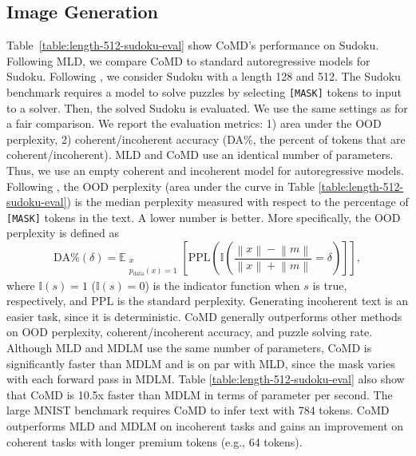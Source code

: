 \documentclass{article} %
\begin{document}
\subsection{Image Generation}
Table~\ref{table:length-512-sudoku-eval} show CoMD's performance on Sudoku. Following MLD, we compare CoMD to standard autoregressive models for Sudoku. Following \citet{coja2020replica}, we consider Sudoku with a length 128 and 512. The Sudoku benchmark requires a model to solve puzzles by selecting \texttt{[MASK]} tokens to input to a solver. Then, the solved Sudoku is evaluated. We use the same settings as \citet{coja2020replica} for a fair comparison. We report the evaluation metrics: 1) area under the OOD perplexity, 2) coherent/incoherent accuracy (DA\%, the percent of tokens that are coherent/incoherent). MLD and CoMD use an identical number of parameters. Thus, we use an empty coherent and incoherent model for autoregressive models. Following \citet{coja2020replica}, the OOD perplexity (area under the curve in Table \ref{table:length-512-sudoku-eval}) is the median perplexity measured with respect to the percentage of \texttt{[MASK]} tokens in the text. A lower number is better. More specifically, the OOD perplexity is defined as
\begin{equation}
\mathrm{DA}\%\left(\delta\right)=\mathbb E_{\substack{x\\ p_{\mathrm{data}}(x)=1}}\left[\mathrm{PPL}\left(\mathbb I\left(\frac{\left\|x\right\|-\left\|m\right\|}{\left\|x\right\|+\left\|m\right\|}=\delta\right)\right]\right],
\end{equation}
where $\mathbb I\left(s\right)=1$ ($\mathbb I\left(s\right)=0$) is the indicator function when $s$ is true, respectively, and $\mathrm{PPL}$ is the standard perplexity.
Generating incoherent text is an easier task, since it is deterministic. CoMD generally outperforms other methods on OOD perplexity, coherent/incoherent accuracy, and puzzle solving rate. Although MLD and MDLM use the same number of parameters, CoMD is significantly faster than MDLM and is on par with MLD, since the mask varies with each forward pass in MDLM. Table \ref{table:length-512-sudoku-eval} also show that CoMD is 10.5x faster than MDLM in terms of parameter per second. The large MNIST benchmark requires CoMD to infer text with 784 tokens. CoMD outperforms MLD and MDLM on incoherent tasks and gains an improvement on coherent tasks with longer premium tokens (e.g., 64 tokens). 
\end{document}
